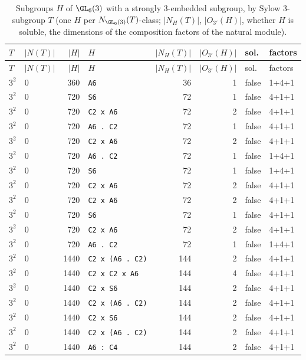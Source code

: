 \begin{longtable}{llrlrrll}
\caption{Subgroups $H$ of $\GL_6(3)$ with a strongly $3$-embedded subgroup, by Sylow $3$-subgroup $T$ (one $H$ per $N_{\GL_6(3)}(T)$-class; $|N_H(T)|$, $|O_{3'}(H)|$, whether $H$ is soluble, the dimensions of the composition factors of the natural module).}\label{tab:gl6}\\
\toprule
$T$ & $|N(T)|$ & $|H|$ & $H$ & $|N_H(T)|$ & $|O_{3'}(H)|$ & sol. & factors\\
\midrule
\endfirsthead
\toprule
$T$ & $|N(T)|$ & $|H|$ & $H$ & $|N_H(T)|$ & $|O_{3'}(H)|$ & sol. & factors\\
\midrule
\endhead
\bottomrule
\endfoot
$3^2$ & 0 & 360 & \texttt{A6} & 36 & 1 & false & 1+4+1\\
$3^2$ & 0 & 720 & \texttt{S6} & 72 & 1 & false & 4+1+1\\
$3^2$ & 0 & 720 & \texttt{C2 x A6} & 72 & 2 & false & 4+1+1\\
$3^2$ & 0 & 720 & \texttt{A6 . C2} & 72 & 1 & false & 4+1+1\\
$3^2$ & 0 & 720 & \texttt{C2 x A6} & 72 & 2 & false & 4+1+1\\
$3^2$ & 0 & 720 & \texttt{A6 . C2} & 72 & 1 & false & 1+4+1\\
$3^2$ & 0 & 720 & \texttt{S6} & 72 & 1 & false & 1+4+1\\
$3^2$ & 0 & 720 & \texttt{C2 x A6} & 72 & 2 & false & 4+1+1\\
$3^2$ & 0 & 720 & \texttt{C2 x A6} & 72 & 2 & false & 4+1+1\\
$3^2$ & 0 & 720 & \texttt{S6} & 72 & 1 & false & 4+1+1\\
$3^2$ & 0 & 720 & \texttt{C2 x A6} & 72 & 2 & false & 4+1+1\\
$3^2$ & 0 & 720 & \texttt{A6 . C2} & 72 & 1 & false & 1+4+1\\
$3^2$ & 0 & 1440 & \texttt{C2 x (A6 . C2)} & 144 & 2 & false & 4+1+1\\
$3^2$ & 0 & 1440 & \texttt{C2 x C2 x A6} & 144 & 4 & false & 4+1+1\\
$3^2$ & 0 & 1440 & \texttt{C2 x S6} & 144 & 2 & false & 4+1+1\\
$3^2$ & 0 & 1440 & \texttt{C2 x (A6 . C2)} & 144 & 2 & false & 4+1+1\\
$3^2$ & 0 & 1440 & \texttt{C2 x S6} & 144 & 2 & false & 4+1+1\\
$3^2$ & 0 & 1440 & \texttt{C2 x (A6 . C2)} & 144 & 2 & false & 4+1+1\\
$3^2$ & 0 & 1440 & \texttt{A6 : C4} & 144 & 2 & false & 4+1+1\\

\end{longtable}
